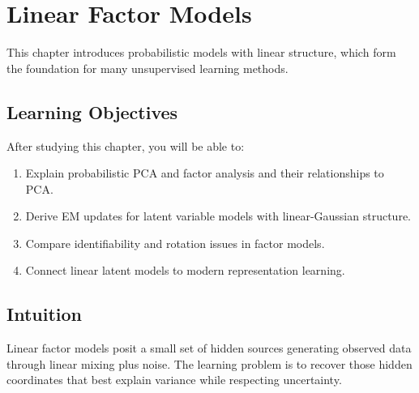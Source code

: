 
\chapter{Linear Factor Models}
\label{chap:linear-factor-models}

This chapter introduces probabilistic models with linear structure, which form the foundation for many unsupervised learning methods.


\section*{Learning Objectives}

After studying this chapter, you will be able to:

\begin{enumerate}
    \item Explain probabilistic PCA and factor analysis and their relationships to PCA.
    \item Derive EM updates for latent variable models with linear-Gaussian structure.
    \item Compare identifiability and rotation issues in factor models.
    \item Connect linear latent models to modern representation learning.
\end{enumerate}


\section*{Intuition}

Linear factor models posit a small set of hidden sources generating observed data through linear mixing plus noise. The learning problem is to recover those hidden coordinates that best explain variance while respecting uncertainty.











